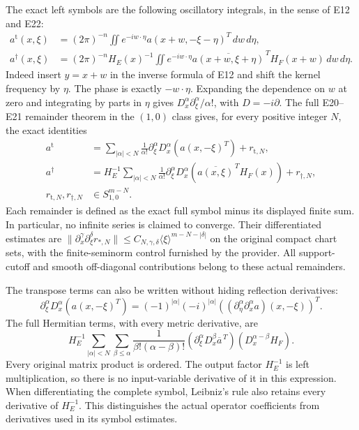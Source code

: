 \documentclass[
  11pt,
]{article}
\begin{document}
The exact left symbols are the following oscillatory integrals, in the
sense of E12 and E22: \[
\begin{aligned}
a^{\mathrm t}(x,\xi)&=(2\pi)^{-n}\iint e^{-iw\cdot\eta}
 a(x+w,-\xi-\eta)^T\,dw\,d\eta,\\
a^\dagger(x,\xi)&=(2\pi)^{-n}H_E(x)^{-1}
 \iint e^{-iw\cdot\eta}
 \overline{a(x+w,\xi+\eta)}^{\,T}H_F(x+w)\,dw\,d\eta.
\end{aligned}
\tag{OA3}
\] Indeed insert \(y=x+w\) in the inverse formula of E12 and shift the
kernel frequency by \(\eta\). The phase is exactly \(-w\cdot\eta\).
Expanding the dependence on \(w\) at zero and integrating by parts in
\(\eta\) gives \(D_x^\alpha\partial_\xi^\alpha/\alpha!\), with
\(D=-i\partial\). The full E20--E21 remainder theorem in the \((1,0)\)
class gives, for every positive integer \(N\), the exact identities \[
\begin{aligned}
a^{\mathrm t}
&=\sum_{|\alpha|<N}\frac1{\alpha!}
 \partial_\xi^\alpha D_x^\alpha(a(x,-\xi)^T)+r_{\mathrm t,N},\\
a^\dagger
&=H_E^{-1}\sum_{|\alpha|<N}\frac1{\alpha!}
 \partial_\xi^\alpha D_x^\alpha
   (\overline{a(x,\xi)}^{\,T}H_F(x))+r_{\dagger,N},\\
r_{\mathrm t,N},r_{\dagger,N}&\in S^{m-N}_{1,0}.
\end{aligned}
\tag{OA4}
\] Each remainder is defined as the exact full symbol minus its
displayed finite sum. In particular, no infinite series is claimed to
converge. Their differentiated estimates are
\(\|\partial_x^\gamma\partial_\xi^\delta r_{*,N}\|\leq C_{N,\gamma,\delta}\langle\xi\rangle^{m-N-|\delta|}\)
on the original compact chart sets, with the finite-seminorm control
furnished by the provider. All support-cutoff and smooth off-diagonal
contributions belong to these actual remainders.

The transpose terms can also be written without hiding reflection
derivatives: \[
\partial_\xi^\alpha D_x^\alpha(a(x,-\xi)^T)
=(-1)^{|\alpha|}(-i)^{|\alpha|}
 ((\partial_\eta^\alpha\partial_x^\alpha a)(x,-\xi))^T.
\tag{OA5}
\] The full Hermitian terms, with every metric derivative, are \[
H_E^{-1}\sum_{|\alpha|<N}\sum_{\beta\leq\alpha}
 \frac1{\beta!(\alpha-\beta)!}
 (\partial_\xi^\alpha D_x^\beta\overline a^{\,T})
 (D_x^{\alpha-\beta}H_F).
\tag{OA6}
\] Every original matrix product is ordered. The output factor
\(H_E^{-1}\) is left multiplication, so there is no input-variable
derivative of it in this expression. When differentiating the complete
symbol, Leibniz's rule also retains every derivative of \(H_E^{-1}\).
This distinguishes the actual operator coefficients from derivatives
used in its symbol estimates.
\end{document}
